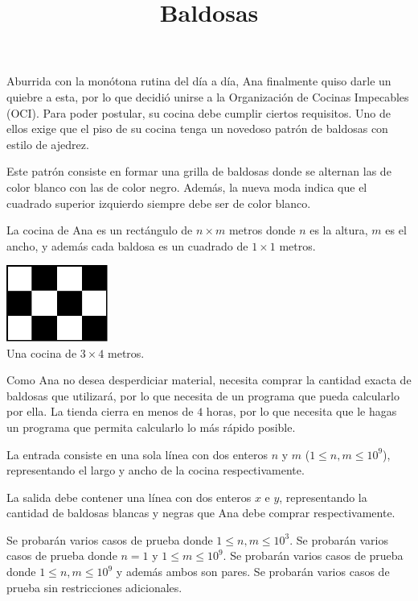 \documentclass{oci}
\title{Baldosas}
\begin{document}
\begin{problemDescription}
  Aburrida con la monótona rutina del día a día, Ana finalmente quiso darle un quiebre a esta, por lo que decidió unirse
  a la Organización de Cocinas Impecables (OCI). Para poder postular, su cocina debe cumplir ciertos requisitos. Uno de ellos
  exige que el piso de su cocina tenga un novedoso patrón de baldosas con estilo de ajedrez.

  Este patrón consiste en formar una grilla de baldosas donde se alternan las de color blanco con las de color negro. Además,
  la nueva moda indica que el cuadrado superior izquierdo siempre debe ser de color blanco.

  La cocina de Ana es un rectángulo de $n \times m$ metros donde $n$ es la altura, $m$ es el ancho, y además cada baldosa es un cuadrado de $1 \times 1$ metros.

  \begin{center}
    \includegraphics[width=0.25\textwidth]{example-checkerboard.pdf} \\
    Una cocina de $3 \times 4$ metros.
  \end{center}

  Como Ana no desea desperdiciar material, necesita comprar la cantidad exacta de baldosas que utilizará, por lo que necesita
  de un programa que pueda calcularlo por ella. La tienda cierra en menos de $4$ horas, por lo que necesita que le hagas un
  programa que permita calcularlo lo más rápido posible.
\end{problemDescription}

\begin{inputDescription}
  La entrada consiste en una sola línea con dos enteros $n$ y $m$ ($1 \leq n, m \leq 10^9$), representando el largo y
  ancho de la cocina respectivamente.
\end{inputDescription}

\begin{outputDescription}
  La salida debe contener una línea con dos enteros $x$ e $y$, representando la cantidad de baldosas blancas y negras que
  Ana debe comprar respectivamente.
\end{outputDescription}

\clearpage
\begin{scoreDescription}
   Se probarán varios casos de prueba donde $1 \leq n, m \leq 10^3$.
   Se probarán varios casos de prueba donde $n = 1$ y $1 \leq m \leq 10^9$.
   Se probarán varios casos de prueba donde $1 \leq n, m \leq 10^9$ y además ambos son pares.
   Se probarán varios casos de prueba sin restricciones adicionales.
\end{scoreDescription}

\begin{sampleDescription}
\end{sampleDescription}
\end{document}
